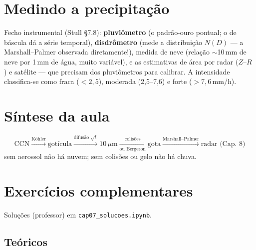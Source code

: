 \documentclass[11pt]{article}
\begin{document}
\section{Medindo a precipitação}

Fecho instrumental (Stull \S7.8): \textbf{pluviômetro} (o padrão-ouro
pontual; o de báscula dá a série temporal), \textbf{disdrômetro}
(mede a distribuição $N(D)$ — a Marshall--Palmer observada
diretamente!), medida de neve (relação $\sim$10\,mm de neve por 1\,mm
de água, muito variável), e as estimativas de área por radar
($Z$--$R$ ) e satélite — que precisam dos
pluviômetros para calibrar. A intensidade classifica-se como fraca
($<2{,}5$), moderada (2,5--7,6) e forte ($>7{,}6$\,mm/h).

\section{Síntese da aula}

\begin{noquadro}
\[ \text{CCN} \xrightarrow{\text{Köhler}} \text{gotícula}
   \xrightarrow{\text{difusão } \sqrt{t}} 10\,\mu\text{m}
   \xrightarrow[\text{ou Bergeron}]{\text{colisões}} \text{gota}
   \xrightarrow{\text{Marshall--Palmer}} \text{radar (Cap.~8)} \]
sem aerossol não há nuvem; sem colisões ou gelo não há chuva.
\end{noquadro}

\section{Exercícios complementares}\label{sec:exercicios}

Soluções (professor) em \texttt{cap07\_solucoes.ipynb}.

\subsection*{Teóricos}
\end{document}

